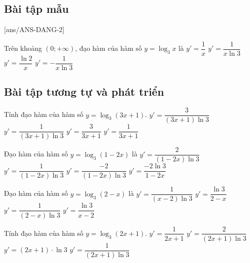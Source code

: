 \subsection{Bài tập mẫu}
[ans/ANS-DANG-2]
\begin{khung}
	\begin{vd}%
		Trên khoảng $(0; +\infty)$, đạo hàm của hàm số $y=\log_3 x$ là
		\choice
		{$y'=\dfrac{1}{x}$}
		{\True $y'=\dfrac{1}{x\ln 3}$}
		{$y'=\dfrac{\ln 2}x$}
		{$y'=-\dfrac{1}{x\ln 3}$}
	\end{vd}
\end{khung}
\subsection{Bài tập tương tự và phát triển}
\begin{ex}%
	Tính đạo hàm của hàm số $y=\log_3(3x+1)$.
	\choice
	{\True $y'=\dfrac{3}{(3x+1)\ln {3}}$}
	{$y'=\dfrac{1}{(3x+1)\ln {3}}$}
	{$y'=\dfrac{3}{3x+1}$}
	{$y'=\dfrac{1}{3x+1}$}
\end{ex}

\begin{ex}%
	Đạo hàm của hàm số $y=\log_3\left(1-2x\right)$ là
	\choice
	{$y'=\dfrac{2}{(1-2x)\ln {3}}$}
	{$y'=\dfrac{1}{(1-2x)\ln {3}}$}
	{\True $y'=\dfrac{-2}{(1-2x)\ln {3}}$}
	{$y'=\dfrac{-2\ln {3}}{1-2x}$}
\end{ex}

\begin{ex}%
	Đạo hàm của hàm số $y=\log_3(2-x)$ là
	\choice
	{\True $y'=\dfrac{1}{(x-2)\ln 3}$}
	{$y'=\dfrac{\ln 3}{2-x}$}
	{$y'=\dfrac{1}{(2-x)\ln 3}$}
	{$y'=\dfrac{\ln 3}{x-2}$}
\end{ex}

\begin{ex}%
	Tính đạo hàm của hàm số $y=\log_3(2x+1)$.
	\choice
	{$y'=\dfrac{1}{2x+1}$}
	{\True $y'=\dfrac{2}{(2x+1)\ln 3}$}
	{$y'=(2x+1)\cdot \ln 3$}
	{$y'=\dfrac{1}{(2x+1)\ln 3}$}
\end{ex}

